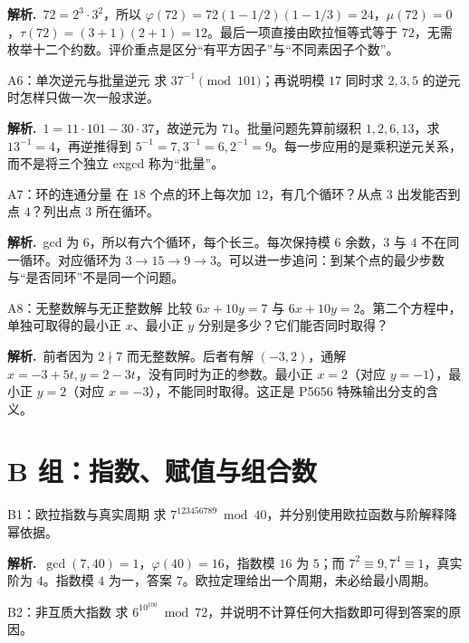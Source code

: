 \documentclass[UTF8,a4paper,11pt,oneside,openany,fontset=fandol]{ctexbook}
\theoremstyle{definition}
\newcommand{\sol}{\par\noindent\textbf{解析.}\ }
\begin{document}
\sol $72=2^3\cdot3^2$，所以 $\varphi(72)=72(1-1/2)(1-1/3)=24$，$\mu(72)=0$，$\tau(72)=(3+1)(2+1)=12$。最后一项直接由欧拉恒等式等于 $72$，无需枚举十二个约数。评价重点是区分“有平方因子”与“不同素因子个数”。


\begin{problem}{A6：单次逆元与批量逆元}
求 $37^{-1}\pmod{101}$；再说明模 $17$ 同时求 $2,3,5$ 的逆元时怎样只做一次一般求逆。
\end{problem}

\sol $1=11\cdot101-30\cdot37$，故逆元为 $71$。批量问题先算前缀积 $1,2,6,13$，求 $13^{-1}=4$，再逆推得到 $5^{-1}=7,3^{-1}=6,2^{-1}=9$。每一步应用的是乘积逆元关系，而不是将三个独立 exgcd 称为“批量”。


\begin{problem}{A7：环的连通分量}
在 $18$ 个点的环上每次加 $12$，有几个循环？从点 $3$ 出发能否到点 $4$？列出点 $3$ 所在循环。
\end{problem}

\sol gcd 为 $6$，所以有六个循环，每个长三。每次保持模 $6$ 余数，$3$ 与 $4$ 不在同一循环。对应循环为 $3\to15\to9\to3$。可以进一步追问：到某个点的最少步数与“是否同环”不是同一个问题。


\begin{problem}{A8：无整数解与无正整数解}
比较 $6x+10y=7$ 与 $6x+10y=2$。第二个方程中，单独可取得的最小正 $x$、最小正 $y$ 分别是多少？它们能否同时取得？
\end{problem}

\sol 前者因为 $2\nmid7$ 而无整数解。后者有解 $(-3,2)$，通解 $x=-3+5t,y=2-3t$，没有同时为正的参数。最小正 $x=2$（对应 $y=-1$），最小正 $y=2$（对应 $x=-3$），不能同时取得。这正是 P5656 特殊输出分支的含义。


\section{B 组：指数、赋值与组合数}
\begin{problem}{B1：欧拉指数与真实周期}
求 $7^{123456789}\bmod40$，并分别使用欧拉函数与阶解释降幂依据。
\end{problem}

\sol $\gcd(7,40)=1$，$\varphi(40)=16$，指数模 $16$ 为 $5$；而 $7^2\equiv9,7^4\equiv1$，真实阶为 $4$。指数模 $4$ 为一，答案 $7$。欧拉定理给出一个周期，未必给最小周期。


\begin{problem}{B2：非互质大指数}
求 $6^{10^{100}}\bmod72$，并说明不计算任何大指数即可得到答案的原因。
\end{problem}
\end{document}
